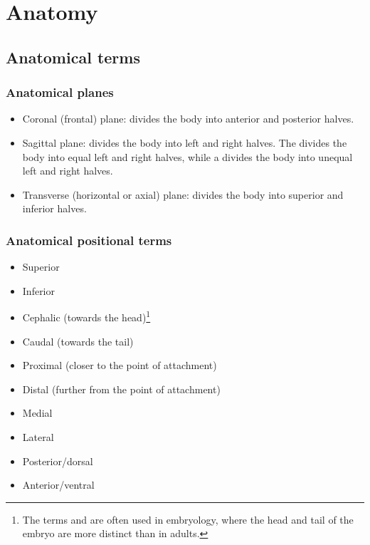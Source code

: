 \chapter{Anatomy}
\label{ch:anatomy}


\section{Anatomical terms}

\subsection{Anatomical planes}

\begin{itemize}
    \item Coronal (frontal) plane: divides the body into anterior and posterior halves.
    \item Sagittal plane: divides the body into left and right halves. The  divides the body into equal left and right halves, while a  divides the body into unequal left and right halves.
    \item Transverse (horizontal or axial) plane: divides the body into superior and inferior halves.
\end{itemize}

\subsection{Anatomical positional terms}

\begin{itemize}
    \item Superior
    \item Inferior 
    \item Cephalic (towards the head)\footnote{The terms  and  are often used in embryology, where the head and tail of the embryo are more distinct than in adults.}
    \item Caudal (towards the tail)\footnotemark[\value{footnote}]
    \item Proximal (closer to the point of attachment)
    \item Distal (further from the point of attachment)
    \item Medial
    \item Lateral
    \item Posterior/dorsal
    \item Anterior/ventral
\end{itemize}

